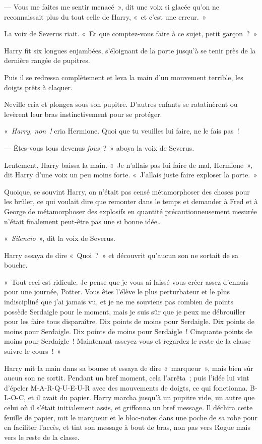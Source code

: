 --- Vous me faites me sentir menacé~», dit une voix si glacée qu'on ne reconnaissait plus du tout celle de Harry, «~et c'est une erreur.~»

La voix de Severus riait.
«~Et que comptez-vous faire à ce sujet, petit garçon~?~»

Harry fit six longues enjambées, s'éloignant de la porte jusqu'à se tenir près de la dernière rangée de pupitres.

Puis il se redressa complètement et leva la main d'un mouvement terrible, les doigts prêts à claquer.

Neville cria et plongea sous son pupitre.
D'autres enfants se ratatinèrent ou levèrent leur bras instinctivement pour se protéger.

«~\emph{Harry, non~!} cria Hermione.
Quoi que tu veuilles lui faire, ne le fais pas~!

--- Êtes-vous tous devenus \emph{fous}~?~»
aboya la voix de Severus.

Lentement, Harry baissa la main.
«~Je n'allais pas lui faire de mal, Hermione~», dit Harry d'une voix un peu moins forte.
«~J'allais juste faire exploser la porte.~»

Quoique, se souvint Harry, on n'était pas censé métamorphoser des choses pour les brûler, ce qui voulait dire que remonter dans le temps et demander à Fred et à George de métamorphoser des explosifs en quantité précautionneusement mesurée n'était finalement peut-être pas une si bonne idée…

«~\emph{Silencio}~», dit la voix de Severus.

Harry essaya de dire «~Quoi~?~» et découvrit qu'aucun son ne sortait de sa bouche.

«~Tout ceci est ridicule.
Je pense que je vous ai laissé vous créer assez d'ennuis pour une journée, Potter.
Vous êtes l'élève le plus perturbateur et le plus indiscipliné que j'ai jamais vu, et je ne me souviens pas combien de points possède Serdaigle pour le moment, mais je suis sûr que je peux me débrouiller pour les faire tous disparaître.
Dix points de moins pour Serdaigle.
Dix points de moins pour Serdaigle.
Dix points de moins pour Serdaigle~!
Cinquante points de moins pour Serdaigle~!
Maintenant asseyez-vous et regardez le reste de la classe suivre le cours~!~»

Harry mit la main dans sa bourse et essaya de dire «~marqueur~», mais bien sûr aucun son ne sortit.
Pendant un bref moment, cela l'arrêta~; puis l'idée lui vint d'épeler M-A-R-Q-U-E-U-R avec des mouvements de doigts, ce qui fonctionna.
B-L-O-C, et il avait du papier.
Harry marcha jusqu'à un pupitre vide, un autre que celui où il s'était initialement assis, et griffonna un bref message.
Il déchira cette feuille de papier, mit le marqueur et le bloc-notes dans une poche de sa robe pour en faciliter l'accès, et tint son message à bout de bras, non pas vers Rogue mais vers le reste de la classe.

